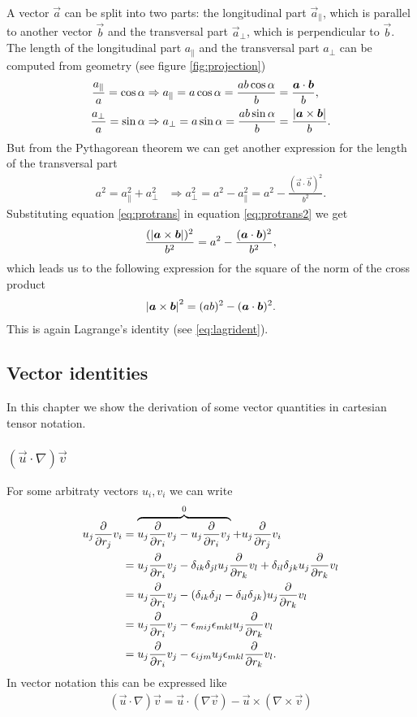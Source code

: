 A vector $\vec{a}$ can be split into two parts: the longitudinal part $\vec{a}_{\parallel}$, 
which is parallel to another vector $\vec{b}$ and the transversal part $\vec{a}_{\perp}$, 
which is perpendicular to $\vec{b}$. The length of the longitudinal part $a_{\parallel}$ 
and the transversal part $a_{\perp}$ can be computed from geometry (see figure \ref{fig:projection})
\begin{align}
\frac{a_{\parallel}}{a}=\cos \alpha & \Rightarrow
a_{\parallel}= a \cos\alpha = \frac{a b \cos \alpha}{b} = \frac{\boldsymbol{a}\cdot\boldsymbol{b}}{b},\\
\frac{a_{\perp}}{a}=\sin \alpha & \Rightarrow 
a_{\perp}= a \sin\alpha = \frac{a b \sin \alpha}{b} = \frac{\left\lvert\boldsymbol{a}\times\boldsymbol{b}\right\rvert}{b}. \label{eq:protrans}
\end{align}
But from the Pythagorean theorem we can get another expression for the length of the transversal
part
\begin{align}
a^2=a_{\parallel}^2+a_{\perp}^2 & \Rightarrow
a_{\perp}^2 = a^2-a_{\parallel}^2= a^2-\frac{(\vec{a}\cdot\vec{b})^2}{b^2}.\label{eq:protrans2}
\end{align}
Substituting equation \eqref{eq:protrans} in equation \eqref{eq:protrans2} we get
\begin{align*}
\frac{(\left\lvert\boldsymbol{a}\times\boldsymbol{b}\right\rvert)^2}{b^2}=a^2-\frac{(\boldsymbol{a}\cdot\boldsymbol{b})^2}{b^2},
\end{align*}
which leads us to the following expression for the square of the norm of the cross product
\begin{align}
\left\lvert\boldsymbol{a}\times\boldsymbol{b}\right\rvert^2 = (a b)^2 - (\boldsymbol{a}\cdot\boldsymbol{b})^2.
\end{align}
This is again Lagrange's identity (see \eqref{eq:lagrident}). 

\subsection{Vector identities}
In this chapter we show the derivation of some vector quantities in cartesian
tensor notation.
\subsubsection{$(\vec{u}\cdot\nabla) \vec{v}$} \label{vecid01}
For some arbitraty vectors $u_i, v_i$ we can write
\begin{align*}
u_j \frac{\partial}{\partial r_j} v_i &= \overbrace{u_j \frac{\partial}{\partial r_i} v_j - u_j \frac{\partial}{\partial r_i} v_j}^0 
+ u_j\frac{\partial}{\partial r_j} v_i \\
&= u_j \frac{\partial}{\partial r_i} v_j - \delta_{ik}\delta_{jl} u_j \frac{\partial}{\partial r_k} v_l 
+\delta_{il}\delta_{jk} u_j \frac{\partial}{\partial r_k} v_l \\
&= u_j \frac{\partial}{\partial r_i} v_j 
- (\delta_{ik}\delta_{jl}-\delta_{il}\delta_{jk})u_j \frac{\partial}{\partial r_k} v_l \\
&= u_j \frac{\partial}{\partial r_i} v_j - \epsilon_{mij} \epsilon_{mkl} u_j \frac{\partial}{\partial r_k} v_l \\
&= u_j \frac{\partial}{\partial r_i} v_j - \epsilon_{ijm} u_j \epsilon_{mkl} \frac{\partial}{\partial r_k} v_l.
\end{align*}
In vector notation this can be expressed like
\begin{align}
(\vec{u}\cdot\nabla) \vec{v} = 
\vec{u}\cdot (\nabla \vec{v})-\vec{u} \times (\nabla \times \vec{v})
\label{eq:vecid01}
\end{align}
